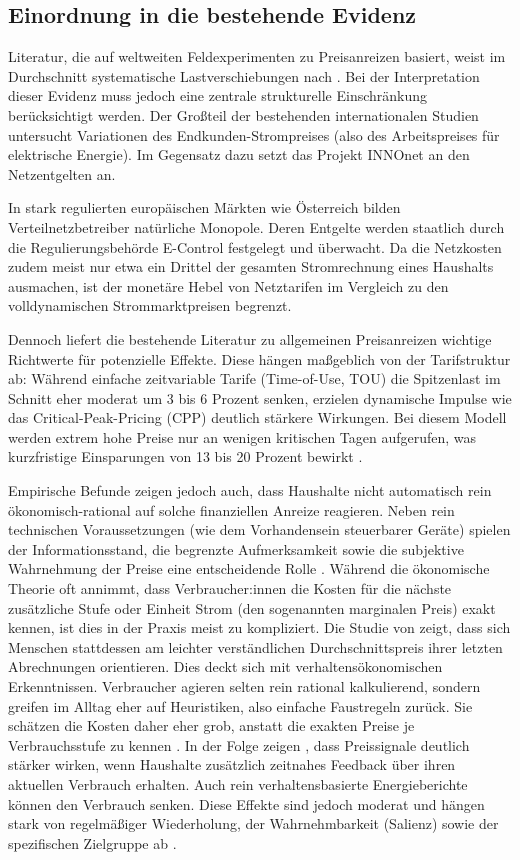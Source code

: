 \subsection{Einordnung in die bestehende Evidenz}
Literatur, die auf weltweiten Feldexperimenten zu Preisanreizen basiert, weist im Durchschnitt systematische Lastverschiebungen nach \citep{khanna2021multi}. Bei der Interpretation dieser Evidenz muss jedoch eine zentrale strukturelle Einschränkung berücksichtigt werden. Der Großteil der bestehenden internationalen Studien untersucht Variationen des Endkunden-Strompreises (also des Arbeitspreises für elektrische Energie). Im Gegensatz dazu setzt das Projekt INNOnet an den Netzentgelten an. 

In stark regulierten europäischen Märkten wie Österreich bilden Verteilnetzbetreiber natürliche Monopole. Deren Entgelte werden staatlich durch die Regulierungsbehörde E-Control festgelegt und überwacht. Da die Netzkosten zudem meist nur etwa ein Drittel der gesamten Stromrechnung eines Haushalts ausmachen, ist der monetäre Hebel von Netztarifen im Vergleich zu den volldynamischen Strommarktpreisen begrenzt.

Dennoch liefert die bestehende Literatur zu allgemeinen Preisanreizen wichtige Richtwerte für potenzielle Effekte. Diese hängen maßgeblich von der Tarifstruktur ab: Während einfache zeitvariable Tarife (Time-of-Use, TOU) die Spitzenlast im Schnitt eher moderat um 3 bis 6 Prozent senken, erzielen dynamische Impulse wie das Critical-Peak-Pricing (CPP) deutlich stärkere Wirkungen. Bei diesem Modell werden extrem hohe Preise nur an wenigen kritischen Tagen aufgerufen, was kurzfristige Einsparungen von 13 bis 20 Prozent bewirkt \citep{faruquiSergiciWarner2017}.

Empirische Befunde zeigen jedoch auch, dass Haushalte nicht automatisch rein ökonomisch-rational auf solche finanziellen Anreize reagieren. Neben rein technischen Voraussetzungen (wie dem Vorhandensein steuerbarer Geräte) spielen der Informationsstand, die begrenzte Aufmerksamkeit sowie die subjektive Wahrnehmung der Preise eine entscheidende Rolle \citep{andor2018behavioral,tiefenbeck2018overcoming}. Während die ökonomische Theorie oft annimmt, dass Verbraucher:innen die Kosten für die nächste zusätzliche Stufe oder Einheit Strom (den sogenannten marginalen Preis) exakt kennen, ist dies in der Praxis meist zu kompliziert. Die Studie von \citet{ito2014} zeigt, dass sich Menschen stattdessen am leichter verständlichen Durchschnittspreis ihrer letzten Abrechnungen orientieren. Dies deckt sich mit verhaltensökonomischen Erkenntnissen. Verbraucher agieren selten rein rational kalkulierend, sondern greifen im Alltag eher auf Heuristiken, also einfache Faustregeln zurück.  Sie schätzen die Kosten daher eher grob, anstatt die exakten Preise je Verbrauchsstufe zu kennen \citep{kahneman2011thinking}. In der Folge zeigen \citet{jessoeRapson2014}, dass Preissignale deutlich stärker wirken, wenn Haushalte zusätzlich zeitnahes Feedback über ihren aktuellen Verbrauch erhalten. Auch rein verhaltensbasierte Energieberichte können den Verbrauch senken. Diese Effekte sind jedoch moderat und hängen stark von regelmäßiger Wiederholung, der Wahrnehmbarkeit (Salienz) sowie der spezifischen Zielgruppe ab \citep{andor2018behavioral}.


